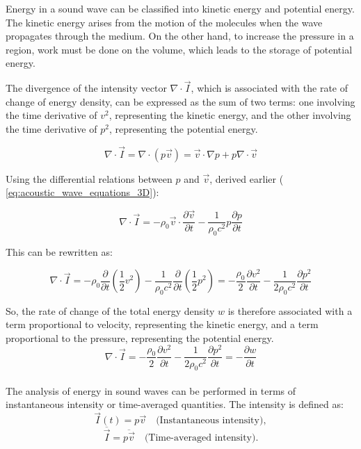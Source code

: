\documentclass[a4paper]{article}
\begin{document}
Energy in a sound wave can be classified into kinetic energy and potential energy. The kinetic energy arises from the motion of the molecules when the wave propagates through the medium. On the other hand, to increase the pressure in a region, work must be done on the volume, which leads to the storage of potential energy.

The divergence of the intensity vector \( \nabla \cdot \vec{I} \), which is associated with the rate of change of energy density, can be expressed as the sum of two terms: one involving the time derivative of \( v^2 \), representing the kinetic energy, and the other involving the time derivative of \( p^2 \), representing the potential energy. 

\[
\nabla \cdot \vec{I} = \nabla \cdot (p \vec{v}) = \vec{v} \cdot \nabla p + p \nabla \cdot \vec{v}
\]

Using the differential relations between \( p \) and \( \vec{v} \), derived earlier ( \ref{eq:acoustic_wave_equations_3D}):

\[
\nabla \cdot \vec{I} = -\rho_0 \vec{v} \cdot \frac{\partial \vec{v}}{\partial t} - \frac{1}{\rho_0 c^2} p \frac{\partial p}{\partial t}
\]

This can be rewritten as:

\[
\nabla \cdot \vec{I} = -\rho_0 \frac{\partial}{\partial t} \left( \frac{1}{2} v^2 \right) - \frac{1}{\rho_0 c^2} \frac{\partial}{\partial t} \left( \frac{1}{2} p^2 \right)
=
 -\frac{\rho_0}{2} \frac{\partial v^2}{\partial t} - \frac{1}{2 \rho_0 c^2} \frac{\partial p^2}{\partial t}
\]



So, the rate of change of the total energy density \( w \) is therefore associated with a term proportional to velocity, representing the kinetic energy, and a term proportional to the pressure, representing the potential energy.
\[
 \nabla \cdot \vec{I} = - \frac{\rho_0}{2} \frac{\partial v^2}{\partial t} - \frac{1}{2 \rho_0 c^2} \frac{\partial p^2}{\partial t} = - \frac{\partial w}{\partial t} 
\] \\





The analysis of energy in sound waves can be performed in terms of instantaneous intensity or time-averaged quantities. The intensity is defined as:
\[
\vec{I}(t) = p \vec{v} \quad \text{(Instantaneous intensity)},
\]
\[
\overline{\vec{I}} = \overline{p \vec{v}} \quad \text{(Time-averaged intensity)}.
\]
\end{document}
